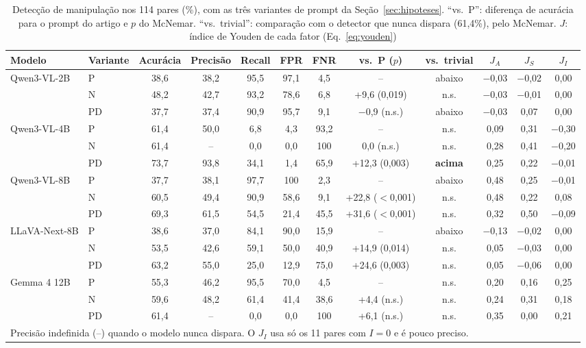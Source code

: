 \documentclass[conference]{IEEEtran}
\begin{document}
\begin{table}[!t]
\renewcommand{\arraystretch}{1.0}
\caption{Detecção de manipulação nos 114 pares (\%), com as três variantes de prompt da
Seção~\ref{sec:hipoteses}. ``vs.~P'': diferença de acurácia para o prompt do artigo e $p$ do
McNemar. ``vs.~trivial'': comparação com o detector que nunca dispara (61,4\%), pelo McNemar. $J$:
índice de Youden de cada fator (Eq.~\ref{eq:youden})}
\label{tab:man}
\centering
\footnotesize
\setlength{\tabcolsep}{4.2pt}
\begin{tabular}{llcccccccccc}
\toprule
Modelo & Variante & Acurácia & Precisão & Recall & FPR & FNR & vs.~P ($p$) & vs.~trivial & $J_A$ & $J_S$ & $J_I$ \\
\midrule
\multirow{3}{*}{Qwen3-VL-2B}
 & P  & 38,6 & 38,2 & 95,5 & 97,1 & 4,5 & -- & abaixo & $-$0,03 & $-$0,02 & 0,00 \\
 & N  & 48,2 & 42,7 & 93,2 & 78,6 & 6,8 & +9,6 (0,019) & n.s. & $-$0,03 & $-$0,01 & 0,00 \\
 & PD & 37,7 & 37,4 & 90,9 & 95,7 & 9,1 & $-$0,9 (n.s.) & abaixo & $-$0,03 & 0,07 & 0,00 \\
\midrule
\multirow{3}{*}{Qwen3-VL-4B}
 & P  & 61,4 & 50,0 & 6,8 & 4,3 & 93,2 & -- & n.s. & 0,09 & 0,31 & $-$0,30 \\
 & N  & 61,4 & -- & 0,0 & 0,0 & 100 & 0,0 (n.s.) & n.s. & 0,28 & 0,41 & $-$0,20 \\
 & PD & 73,7 & 93,8 & 34,1 & 1,4 & 65,9 & +12,3 (0,003) & \textbf{acima} & 0,25 & 0,22 & $-$0,01 \\
\midrule
\multirow{3}{*}{Qwen3-VL-8B}
 & P  & 37,7 & 38,1 & 97,7 & 100 & 2,3 & -- & abaixo & 0,48 & 0,25 & $-$0,01 \\
 & N  & 60,5 & 49,4 & 90,9 & 58,6 & 9,1 & +22,8 ($<$0,001) & n.s. & 0,48 & 0,22 & 0,08 \\
 & PD & 69,3 & 61,5 & 54,5 & 21,4 & 45,5 & +31,6 ($<$0,001) & n.s. & 0,32 & 0,50 & $-$0,09 \\
\midrule
\multirow{3}{*}{LLaVA-Next-8B}
 & P  & 38,6 & 37,0 & 84,1 & 90,0 & 15,9 & -- & abaixo & $-$0,13 & $-$0,02 & 0,00 \\
 & N  & 53,5 & 42,6 & 59,1 & 50,0 & 40,9 & +14,9 (0,014) & n.s. & 0,05 & $-$0,03 & 0,00 \\
 & PD & 63,2 & 55,0 & 25,0 & 12,9 & 75,0 & +24,6 (0,003) & n.s. & 0,05 & $-$0,06 & 0,00 \\
\midrule
\multirow{3}{*}{Gemma 4 12B}
 & P  & 55,3 & 46,2 & 95,5 & 70,0 & 4,5 & -- & n.s. & 0,20 & 0,16 & 0,25 \\
 & N  & 59,6 & 48,2 & 61,4 & 41,4 & 38,6 & +4,4 (n.s.) & n.s. & 0,24 & 0,31 & 0,18 \\
 & PD & 61,4 & -- & 0,0 & 0,0 & 100 & +6,1 (n.s.) & n.s. & 0,35 & 0,00 & 0,21 \\
\midrule
\bottomrule
\multicolumn{12}{l}{\scriptsize Precisão indefinida (--) quando o modelo nunca dispara. O $J_I$ usa só os 11 pares com $I=0$ e é pouco preciso.}
\end{tabular}
\end{table}
\end{document}

